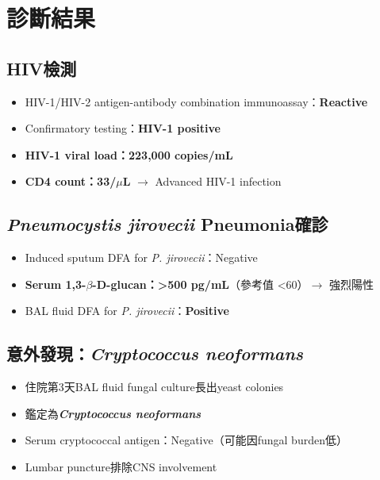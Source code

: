 \documentclass[12pt,a4paper]{article}
\begin{document}
\section{診斷結果}

\subsection{HIV檢測}
\begin{itemize}
    \item HIV-1/HIV-2 antigen-antibody combination immunoassay：\textbf{Reactive}
    \item Confirmatory testing：\textbf{HIV-1 positive}
    \item \textbf{HIV-1 viral load：223,000 copies/mL}
    \item \textbf{CD4 count：33/$\mu$L} $\rightarrow$ Advanced HIV-1 infection
\end{itemize}

\subsection{\textit{Pneumocystis jirovecii} Pneumonia確診}
\begin{itemize}
    \item Induced sputum DFA for \textit{P. jirovecii}：Negative
    \item \textbf{Serum 1,3-$\beta$-D-glucan：>500 pg/mL}（參考值 <60）$\rightarrow$ 強烈陽性
    \item BAL fluid DFA for \textit{P. jirovecii}：\textbf{Positive}
\end{itemize}

\subsection{意外發現：\textit{Cryptococcus neoformans}}
\begin{itemize}
    \item 住院第3天BAL fluid fungal culture長出yeast colonies
    \item 鑑定為\textbf{\textit{Cryptococcus neoformans}}
    \item Serum cryptococcal antigen：Negative（可能因fungal burden低）
    \item Lumbar puncture排除CNS involvement
\end{itemize}

\end{document}
